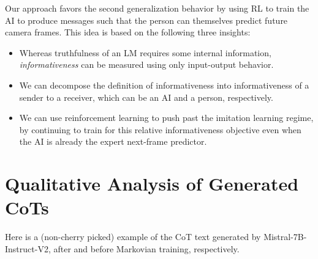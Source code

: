 \documentclass{article}
\begin{document}
Our approach favors the second generalization behavior by using RL to train the AI to produce messages such that the person can themselves predict future camera frames.
This idea is based on the following three insights:
\begin{itemize}
\item Whereas truthfulness of an LM requires some internal information, \emph{informativeness} can be measured using only input-output behavior.
\item We can decompose the definition of informativeness into informativeness of a sender to a receiver, which can be an AI and a person, respectively.
\item We can use reinforcement learning to push past the imitation learning regime, by continuing to train for this relative informativeness objective even when the AI is already the expert next-frame predictor.
\end{itemize}

\section{Qualitative Analysis of Generated CoTs}
Here is a (non-cherry picked) example of the CoT text generated by Mistral-7B-Instruct-V2, after and before Markovian training, respectively.  
\end{document}
